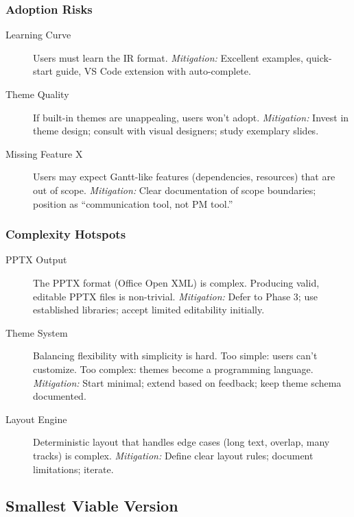 \subsubsection{Adoption Risks}

\begin{description}
  \item[Learning Curve] Users must learn the IR format. \emph{Mitigation:} Excellent examples, quick-start guide, VS Code extension with auto-complete.
  
  \item[Theme Quality] If built-in themes are unappealing, users won't adopt. \emph{Mitigation:} Invest in theme design; consult with visual designers; study exemplary slides.
  
  \item[Missing Feature X] Users may expect Gantt-like features (dependencies, resources) that are out of scope. \emph{Mitigation:} Clear documentation of scope boundaries; position as ``communication tool, not PM tool.''
\end{description}

\subsubsection{Complexity Hotspots}

\begin{description}
  \item[PPTX Output] The PPTX format (Office Open XML) is complex. Producing valid, editable PPTX files is non-trivial. \emph{Mitigation:} Defer to Phase 3; use established libraries; accept limited editability initially.
  
  \item[Theme System] Balancing flexibility with simplicity is hard. Too simple: users can't customize. Too complex: themes become a programming language. \emph{Mitigation:} Start minimal; extend based on feedback; keep theme schema documented.
  
  \item[Layout Engine] Deterministic layout that handles edge cases (long text, overlap, many tracks) is complex. \emph{Mitigation:} Define clear layout rules; document limitations; iterate.
\end{description}

\subsection{Smallest Viable Version}

